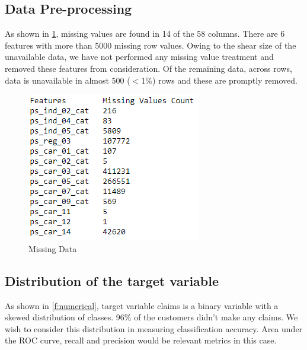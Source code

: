 \subsection{Data Pre-processing}

As shown in \ref{f:missing}, missing values are found in 14 of the 58 columns. There are 6 features with more than 5000 missing row values. Owing to the shear size of the unavailable data, we have not performed any missing value treatment and removed these features from consideration. Of the remaining data, across rows, data is unavailable in almost 500 ($<$1\%) rows and these are promptly removed.

\begin{figure}
  \centering\includegraphics[width=\columnwidth]{images/missingdata}
  \caption{Missing Data}\label{f:missing}
\end{figure}

\subsection{Distribution of the target variable}
As shown in \ref{f:numerical}, target variable claims is a binary variable with a skewed distribution of classes. 96\% of the customers didn't make any claims. We wish to consider this distribution in measuring classification accuracy. Area under the ROC curve, recall and precision would be relevant metrics in this case.
 
